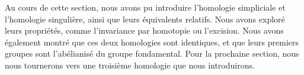 
Au cours de cette section, nous avons pu introduire l'homologie simpliciale et l'homologie singulière, ainsi que leurs équivalents relatifs. Nous avons exploré leurs propriétés, comme l'invariance par homotopie ou l'excision. Nous avons également montré que ces deux homologies sont identiques, et que leurs premiers groupes sont l'abélianisé du groupe fondamental. Pour la prochaine section, nous nous tournerons vers une troisième homologie que nous introduirons.